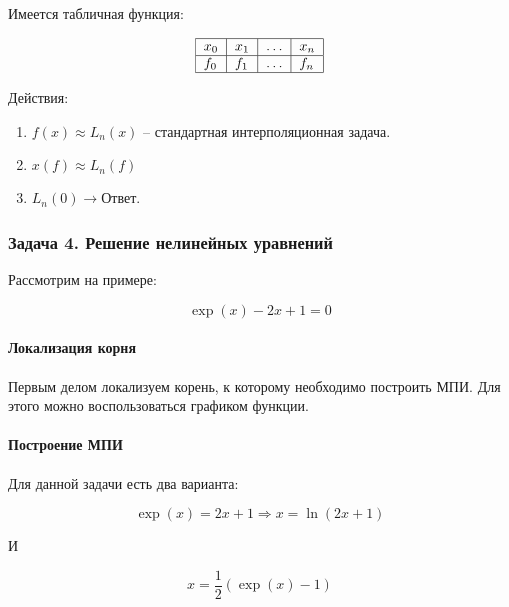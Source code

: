 \documentclass[10pt,a4paper]{article}
\begin{document}
	Имеется табличная функция:
	
	\begin{equation}
	\centering
	\begin{tabular}{|l|l|l|l|}
	\hline
		$x_{0}$ & $x_{1}$ & $\ldots$ & $x_{n}$ \\ \hline
		$f_{0}$ & $f_{1}$ & $\ldots$ & $f_{n}$ \\ \hline
	\end{tabular} 
	\end{equation}
	
	Действия:
	
	\begin{enumerate}
		\item $f\left(x\right) \approx L_{n}\left(x\right)$ -- стандартная 
		интерполяционная задача.
		\item $x\left(f\right) \approx L_{n}\left(f\right)$ 
		\item $L_{n}\left(0\right) \rightarrow $Ответ.
	\end{enumerate}
	
	\subsubsection{Задача 4. Решение нелинейных уравнений}
	
	Рассмотрим на примере:
	
	\begin{equation}
		\exp\left(x\right) - 2x + 1 = 0
	\end{equation}
	
	\paragraph{Локализация корня} Первым делом локализуем корень, к которому
	необходимо построить МПИ. Для этого можно воспользоваться графиком функции.
	
	\paragraph{Построение МПИ} Для данной задачи есть два варианта:
	
	\begin{equation}
		\exp\left(x\right) = 2x + 1 \Rightarrow x = \ln\left(2x + 1\right)
	\end{equation}
	
	И 
	
	\begin{equation}
		x = \frac{1}{2}\left(\exp\left(x\right) - 1\right)
	\end{equation}
	
\end{document}

